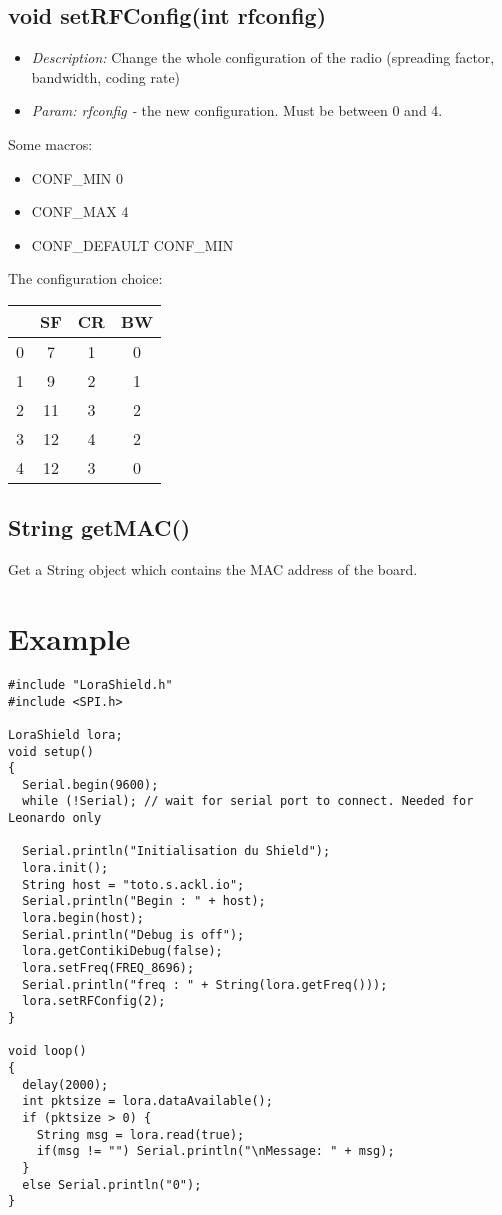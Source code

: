 \documentclass{article}
\begin{document}
\subsection{void setRFConfig(int rfconfig)}
\begin{itemize}
  \item \emph{Description:} Change the whole configuration of the radio (spreading factor, bandwidth, coding rate)
  \item \emph{Param: rfconfig -} the new configuration. Must be between 0 and 4.
\end{itemize}
Some macros:
\begin{itemize}
  \item CONF\_MIN     0
  \item CONF\_MAX     4
  \item CONF\_DEFAULT CONF\_MIN
\end{itemize}
The configuration choice:\\
\begin{tabular}{|c|c|c|c|}
\hline
& SF & CR & BW\\
\hline
0 & 7 & 1 & 0\\
\hline
1 & 9 & 2 & 1\\
\hline
2 & 11 & 3 & 2\\
\hline
3 & 12 & 4 & 2\\
\hline
4 & 12 & 3 & 0\\
\hline
\end{tabular}

\subsection{String getMAC()}
Get a String object which contains the MAC address of the board.

\section{Example}
\begin{verbatim}
#include "LoraShield.h"
#include <SPI.h>

LoraShield lora;
void setup()
{
  Serial.begin(9600);
  while (!Serial); // wait for serial port to connect. Needed for Leonardo only
  
  Serial.println("Initialisation du Shield");
  lora.init();
  String host = "toto.s.ackl.io";
  Serial.println("Begin : " + host);
  lora.begin(host);
  Serial.println("Debug is off");
  lora.getContikiDebug(false);
  lora.setFreq(FREQ_8696);
  Serial.println("freq : " + String(lora.getFreq()));
  lora.setRFConfig(2);
}

void loop()
{
  delay(2000);
  int pktsize = lora.dataAvailable();
  if (pktsize > 0) {
    String msg = lora.read(true);
    if(msg != "") Serial.println("\nMessage: " + msg);
  }
  else Serial.println("0");
}
\end{verbatim}
\end{document}
